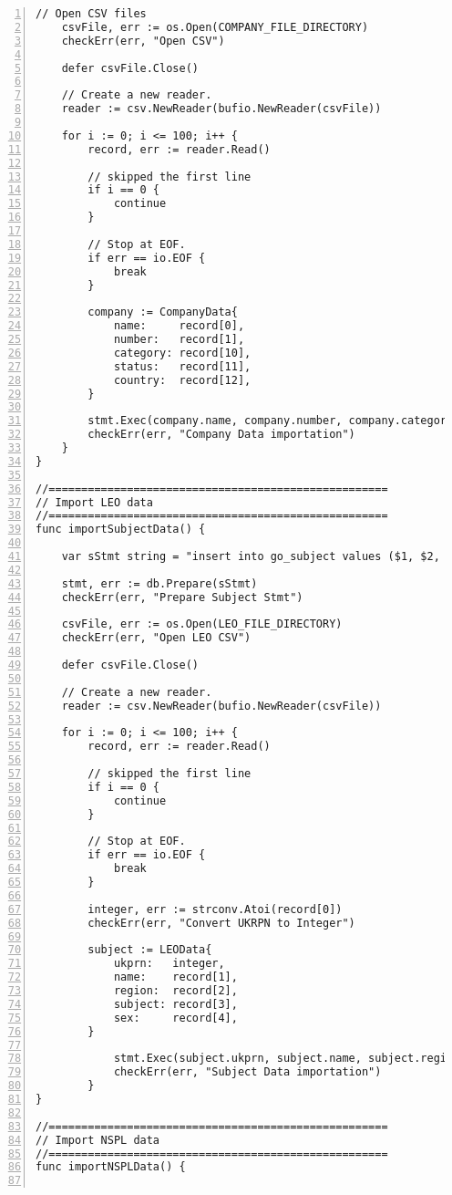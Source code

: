 \begin{lstlisting}[breaklines, frame=single, numbers=left, caption={Source code of Go program}, label=commandline-02]
	// Open CSV files
	csvFile, err := os.Open(COMPANY_FILE_DIRECTORY)
	checkErr(err, "Open CSV")
	
	defer csvFile.Close()
	
	// Create a new reader.
	reader := csv.NewReader(bufio.NewReader(csvFile))
	
	for i := 0; i <= 100; i++ {
		record, err := reader.Read()
		
		// skipped the first line
		if i == 0 {
			continue
		}
		
		// Stop at EOF.
		if err == io.EOF {
			break
		}
		
		company := CompanyData{
			name:     record[0],
			number:   record[1],
			category: record[10],
			status:   record[11],
			country:  record[12],
		}
		
		stmt.Exec(company.name, company.number, company.category, company.status, company.country)
		checkErr(err, "Company Data importation")
	}
}

//====================================================
// Import LEO data
//====================================================
func importSubjectData() {

	var sStmt string = "insert into go_subject values ($1, $2, $3, $4, $5)"
	
	stmt, err := db.Prepare(sStmt)
	checkErr(err, "Prepare Subject Stmt")
	
	csvFile, err := os.Open(LEO_FILE_DIRECTORY)
	checkErr(err, "Open LEO CSV")
	
	defer csvFile.Close()
	
	// Create a new reader.
	reader := csv.NewReader(bufio.NewReader(csvFile))
	
	for i := 0; i <= 100; i++ {
		record, err := reader.Read()
		
		// skipped the first line
		if i == 0 {
			continue
		}
		
		// Stop at EOF.
		if err == io.EOF {
			break
		}
		
		integer, err := strconv.Atoi(record[0])
		checkErr(err, "Convert UKRPN to Integer")
		
		subject := LEOData{
			ukprn:   integer,
			name:    record[1],
			region:  record[2],
			subject: record[3],
			sex:     record[4],
		}
		
			stmt.Exec(subject.ukprn, subject.name, subject.region, subject.subject, subject.sex)
			checkErr(err, "Subject Data importation")
		}
}

//====================================================
// Import NSPL data
//====================================================
func importNSPLData() {


\end{lstlisting}
